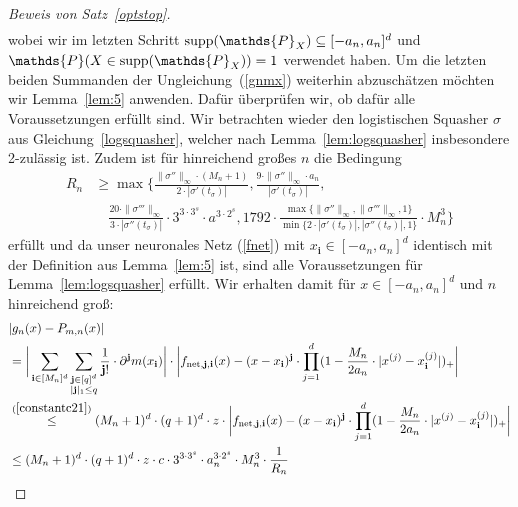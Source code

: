 \begin{proof}[Beweis von Satz~\ref{optstop}]
\begin{equation}
\begin{split}
\end{split}
\end{equation}
wobei wir im letzten Schritt $\supp(\mathds{P}_X) \subseteq [-a_n, a_n]^d$ und $\mathds{P}(X \in \supp(\mathds{P}_X)) = 1$ verwendet haben. Um die letzten beiden Summanden der Ungleichung~(\ref{gnmx}) weiterhin abzuschätzen möchten wir Lemma~\ref{lem:5} anwenden. Dafür überprüfen wir, ob dafür alle Voraussetzungen erfüllt sind. Wir betrachten wieder den logistischen Squasher $\sigma$ aus Gleichung~\ref{logsquasher}, welcher nach Lemma~\ref{lem:logsquasher} insbesondere 2-zulässig ist. Zudem ist für hinreichend großes $n$ die Bedingung 
\begin{equation*}
\begin{split}
R_n & \geq \max\biggl\{\frac{\|\sigma''\|_{\infty} \cdot (M_n + 1)}{2 \cdot |\sigma'(t_{\sigma})|}, \frac{9 \cdot \|\sigma''\|_{\infty} \cdot a_n}{|\sigma'(t_{\sigma})|}, \\
& \quad \frac{20 \cdot \|\sigma'''\|_{\infty}}{3 \cdot |\sigma''(t_{\sigma})|} \cdot 3^{3 \cdot 3^s} \cdot a^{3 \cdot 2^s}, 1792 \cdot \frac{\max\{\|\sigma''\|_{\infty},\|\sigma'''\|_{\infty}, 1\}}{\min\{2 \cdot |\sigma'(t_{\sigma})|, |\sigma''(t_{\sigma})|, 1\}} \cdot M_n^3 \biggr\}
\end{split}
\end{equation*}
erfüllt und da unser neuronales Netz (\ref{fnet}) mit $x_{\mathbf{i}} \in [-a_n, a_n]^d$ identisch mit der Definition aus Lemma~\ref{lem:5} ist, sind alle Voraussetzungen für Lemma~\ref{lem:logsquasher} erfüllt.
Wir erhalten damit für $x \in [-a_n ,a_n]^d$ und $n$ hinreichend groß:
\begin{equation}
\label{1stsum}
\begin{split}
& |g_n(x) - P_{m,n}(x)| \\
& = \bigg| \sum_{\bi \in [M_n]^d} \sum_{\substack{ \bj \in [q]^d \\ |\bj|_1 \leq q}} \frac{1}{\bj!} \cdot \partial^{\bj} m (x_{\mathbf{i}}) \bigg| \cdot \bigg| f_{\net,\bj,\mathbf{i}}(x) - (x - x_{\mathbf{i}})^{\bj} \cdot \prod_{j = 1}^d(1 - \frac{M_n}{2a_n} \cdot |x^{(j)} - x_{\mathbf{i}}^{(j)}|)_+ \bigg| \\
& \stackrel{(\ref{constantc21})}{\leq} (M_n + 1)^d \cdot (q + 1)^d \cdot z \cdot \bigg| f_{\net,\bj,\mathbf{i}}(x) - (x - x_{\mathbf{i}})^{\bj} \cdot \prod_{j = 1}^d(1 - \frac{M_n}{2a_n} \cdot |x^{(j)} - x_{\mathbf{i}}^{(j)}|)_+ \bigg| \\
& \leq (M_n + 1)^d \cdot (q + 1)^d \cdot z \cdot c \cdot 3^{3 \cdot 3^s} \cdot a_n^{3 \cdot 2^s} \cdot M_n^3 \cdot \frac{1}{R_n} \\

\end{split}
\end{equation}
\end{proof}
